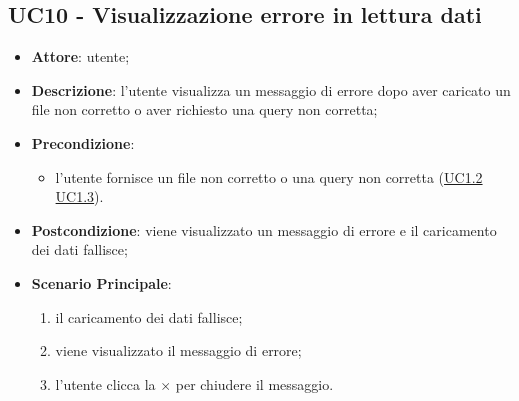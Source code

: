 \subsection{UC10 - Visualizzazione errore in lettura dati}
    \label{uc10}
    \begin{itemize}
    \item \textbf{Attore}: utente;
    \item \textbf{Descrizione}: l’utente visualizza un messaggio di errore dopo aver caricato un file non corretto o aver richiesto una query non corretta;
    \item \textbf{Precondizione}: 
    \begin{itemize}
        \item l'utente fornisce un file non corretto o una query non corretta (\hyperref[uc1.2]{UC1.2} \hyperref[uc1.3]{UC1.3}).
    \end{itemize}  
    \item \textbf{Postcondizione}: viene visualizzato un messaggio di errore e il caricamento dei dati fallisce;
    \item \textbf{Scenario Principale}: 
    \begin{enumerate}
        \item il caricamento dei dati fallisce;
        \item viene visualizzato il messaggio di errore;
        \item l'utente clicca la $\times$ per chiudere il messaggio.
    \end{enumerate}
    \end{itemize}